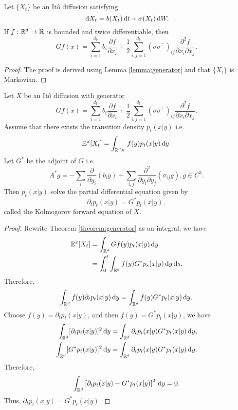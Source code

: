 \begin{theorem}
  \label{theorem:generator}
  Let $\{X_t\}$ be an Itô diffusion satisfying
  $$\,\mathrm{d} X_t = b(X_t)\,\mathrm{d} t + \sigma(X_t)\,\mathrm{d} W.$$
  If $f:\mathbb{R}^d\to \mathbb{R}$ is bounded and twice differentiable, then
  \begin{equation}
    Gf(x) = \sum\limits_{i=1}^{d_Y} b_i \dfrac{\partial f}{\partial x_i} + \dfrac{1}{2}\sum\limits_{i,j=1}^{d_Y} (\sigma\sigma^\top)_{ij}\dfrac{\partial^2f}{\partial x_i \partial x_j}.
  \end{equation}
\end{theorem}
\begin{proof}
  The proof is derived using Lemma \ref{lemma:generator} and that $\{X_t\}$ is Markovian.
\end{proof}

\begin{theorem}
  Let $X$ be an Itô diffusion with generator
  $$ Gf(x) = \sum\limits_{i=1}^{d_Y} b_i \dfrac{\partial f}{\partial x_i} + \dfrac{1}{2}\sum\limits_{i,j=1}^{d_Y} (\sigma\sigma^\top)_{ij}\dfrac{\partial^2f}{\partial x_i \partial x_j}.$$
  Assume that there exists the transition density $p_{t}(x|y)$ i.e.
  \begin{equation}
    \mathbb{E}^x[X_t] = \int_{\mathbb{R}^{d_X}} f(y) p_{t}(x|y)\,\mathrm{d} y.
  \end{equation}
  Let $G^*$ be the adjoint of $G$ i.e.
  \begin{equation}
    A^*g = - \sum\limits_{i} \dfrac{\partial}{\partial y_i} (b_ig) + \sum\limits_{i,j} \dfrac{\partial^2}{\partial y_i\partial y_j} (\sigma_{ij}g) , g\in C^2.
  \end{equation}
  Then $p_t(x|y)$ solve the partial differential equation given by
  \begin{equation}
    \label{equation:forward-kolmogorov}
    \partial_t p_{t}(x|y) = G^*p_{t}(x|y),
  \end{equation}
  called the Kolmogorov forward equation of $X$.
\end{theorem}
\begin{proof}
  Rewrite Theorem \ref{theorem:generator} as an integral, we have
  \begin{align*}
    \mathbb{E}^x[X_t]
     & = \int_{\mathbb{R}^d} G f(y) p_{t}(x|y)\,\mathrm{d} y                \\
     & = \int_0^t\int_{\mathbb{R}^d} f(y) G^*p_{s}(x|y)\,\mathrm{d} y \,\mathrm{d} s.
  \end{align*}
  Therefore,
  $$\int_{\mathbb{R}^d} f(y)\partial_t p_{t}(x|y)\,\mathrm{d} y = \int_{\mathbb{R}^d} f(y) G^*p_{t}(x|y)\,\mathrm{d} y.$$
  Choose $f(y) = \partial_t p_{t}(x|y)$, and then $f(y) = G^*p_{t}(x|y)$, we have
  \begin{align*}
    \int_{\mathbb{R}^d} [\partial_t p_{t}(x|y)]^2 \,\mathrm{d} y
     & = \int_{\mathbb{R}^d} \partial_t p_{t}(x|y) G^*p_{t}(x|y)\,\mathrm{d} y, \\
    \int_{\mathbb{R}^d} [G^*p_{t}(x|y)]^2 \,\mathrm{d} y
     & = \int_{\mathbb{R}^d} \partial_t p_{t}(x|y) G^*p_{t}(x|y)\,\mathrm{d} y.
  \end{align*}
  Therefore,
  $$\int_{\mathbb{R}^d} \left[\partial_t p_{t}(x|y) - G^*p_{t}(x|y)\right]^2 \,\mathrm{d} y = 0.$$
  Thus, $\partial_t p_{t}(x|y) = G^*p_{t}(x|y).$
\end{proof}
